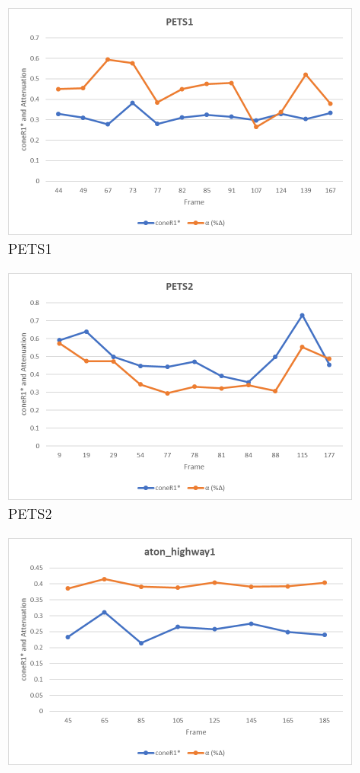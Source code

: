 \begin{appendices}
\begin{figure}
  \begin{subfigure}{.45\linewidth}
  \includegraphics[width=1\linewidth]{figures/appendix/pets1_rgb.jpg}
  \caption{PETS1}
\end{subfigure}
\hfill
\begin{subfigure}{.45\linewidth}
  \includegraphics[width=1\linewidth]{figures/appendix/pets2_rgb.jpg}
  \caption{PETS2}
\end{subfigure}
\hfill
\begin{subfigure}{.45\linewidth}
  \includegraphics[width=1\linewidth]{figures/appendix/highway1_rgb.jpg}

\end{subfigure}
\end{figure}
\end{appendices}
